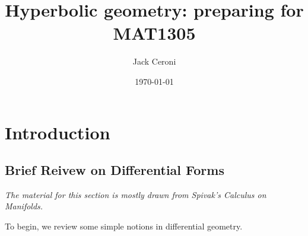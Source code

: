 \documentclass[aps,pra,showpacs,notitlepage,onecolumn,superscriptaddress,nofootinbib]{revtex4-1}
\theoremstyle{definition}
\begin{document}
\title{Hyperbolic geometry: preparing for MAT1305}
\author{Jack Ceroni}
\date{\today}


\maketitle

\section{Introduction}

\subsection{Brief Reivew on Differential Forms}

\noindent
\textit{The material for this section is mostly drawn from Spivak's Calculus on Manifolds.}

\noindent
To begin, we review some simple notions in differential geometry.
\end{document}
